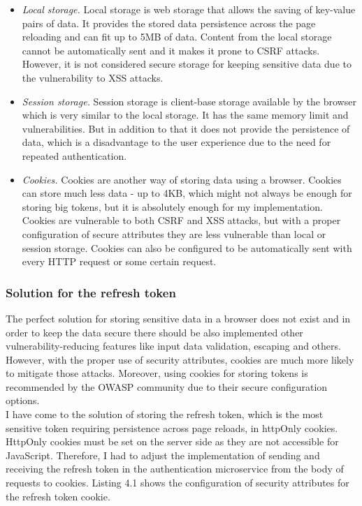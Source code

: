 \begin{itemize}
    \item \emph{Local storage.} Local storage is web storage that allows the saving of key-value pairs of data. It provides the stored data persistence across the page reloading and can fit up to 5MB of data. Content from the local storage cannot be automatically sent and it makes it prone to CSRF attacks. However, it is not considered secure storage for keeping sensitive data due to the vulnerability to XSS attacks.
    \item \emph{Session storage.} Session storage is client-base storage available by the browser which is very similar to the local storage. It has the same memory limit and vulnerabilities. But in addition to that it does not provide the persistence of data, which is a disadvantage to the user experience due to the need for repeated authentication.
    \item \emph{Cookies.} Cookies are another way of storing data using a browser. Cookies can store much less data - up to 4KB, which might not always be enough for storing big tokens, but it is absolutely enough for my implementation. Cookies are vulnerable to both CSRF and XSS attacks, but with a proper configuration of secure attributes they are less vulnerable than local or session storage. Cookies can also be configured to be automatically sent with every HTTP request or some certain request.
\end{itemize}

\subsubsection{Solution for the refresh token} The perfect solution for storing sensitive data in a browser does not exist and in order to keep the data secure there should be also implemented other vulnerability-reducing features like input data validation, escaping and others. However, with the proper use of security attributes, cookies are much more likely to mitigate those attacks. \cite{ls-vs-cookies} Moreover, using cookies for storing tokens is recommended by the OWASP \cite{owasp} community due to their secure configuration options. \cite{ls-vs-cookies-2} \\
I have come to the solution of storing the refresh token, which is the most sensitive token requiring persistence across page reloads, in httpOnly cookies. HttpOnly cookies must be set on the server side as they are not accessible for JavaScript. Therefore, I had to adjust the implementation of sending and receiving the refresh token in the authentication microservice from the body of requests to cookies. Listing 4.1 shows the configuration of security attributes for the refresh token cookie.

